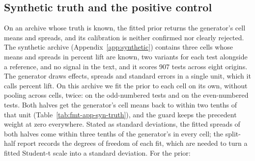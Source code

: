 \subsection{Synthetic truth and the positive control}
\label{sec:synthetic-results}
On an archive whose truth is known, the fitted prior returns the generator's cell means and spreads, and its calibration is neither confirmed nor clearly rejected. The synthetic archive (Appendix~\ref{app:synthetic}) contains three cells whose means and spreads in percent lift are known, two variants for each test alongside a reference, and no signal in the text, and it scores 907 tests across eight origins. The generator draws effects, spreads and standard errors in a single unit, which it calls percent lift. On this archive we fit the prior to each cell on its own, without pooling across cells, twice: on the odd-numbered tests and on the even-numbered tests. Both halves get the generator's cell means back to within two tenths of that unit (Table~\ref{tab:fmt-app-syn-truth}), and the guard keeps the precedent weight at zero everywhere. Stated as standard deviations, the fitted spreads of both halves come within three tenths of the generator's in every cell; the split-half report records the degrees of freedom of each fit, which are needed to turn a fitted Student-t scale into a standard deviation. For the prior:
